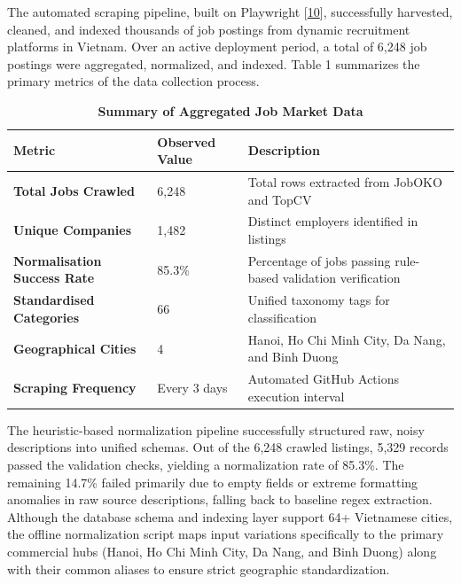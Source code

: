 \documentclass[12pt, a4paper]{report}
\begin{document}
\setlength{\parindent}{0.7cm}
\setlength{\parskip}{0.1cm}

The automated scraping pipeline, built on Playwright [\hyperlink{cite10}{10}], successfully harvested, cleaned, and indexed thousands of job postings from dynamic recruitment platforms in Vietnam. Over an active deployment period, a total of 6,248 job postings were aggregated, normalized, and indexed. Table 1 summarizes the primary metrics of the data collection process.

\begin{table}[H]
    \centering
    \caption[Summary of Aggregated Job Market Data]{\textbf{Summary of Aggregated Job Market Data}}
    \vspace{0.2cm}
    \normalsize
    \renewcommand{\arraystretch}{1.3}
    \begin{tabularx}{\textwidth}{Z{0.75} | Z{0.45} | Z{1.8}}
    \hline\hline
    Metric & Observed Value & Description \\
    \hline
    \textbf{Total Jobs Crawled} & 6,248 & Total rows extracted from JobOKO and TopCV \\
    \textbf{Unique Companies} & 1,482 & Distinct employers identified in listings \\
    \textbf{Normalisation Success Rate} & 85.3\% & Percentage of jobs passing rule-based validation verification \\
    \textbf{Standardised Categories} & 66 & Unified taxonomy tags for classification \\
    \textbf{Geographical Cities} & 4 & Hanoi, Ho Chi Minh City, Da Nang, and Binh Duong \\
    \textbf{Scraping Frequency} & Every 3 days & Automated GitHub Actions execution interval \\
    \hline\hline
    \end{tabularx}
\end{table}

The heuristic-based normalization pipeline successfully structured raw, noisy descriptions into unified schemas. Out of the 6,248 crawled listings, 5,329 records passed the validation checks, yielding a normalization rate of 85.3\%. The remaining 14.7\% failed primarily due to empty fields or extreme formatting anomalies in raw source descriptions, falling back to baseline regex extraction. Although the database schema and indexing layer support 64+ Vietnamese cities, the offline normalization script maps input variations specifically to the primary commercial hubs (Hanoi, Ho Chi Minh City, Da Nang, and Binh Duong) along with their common aliases to ensure strict geographic standardization.
\end{document}
